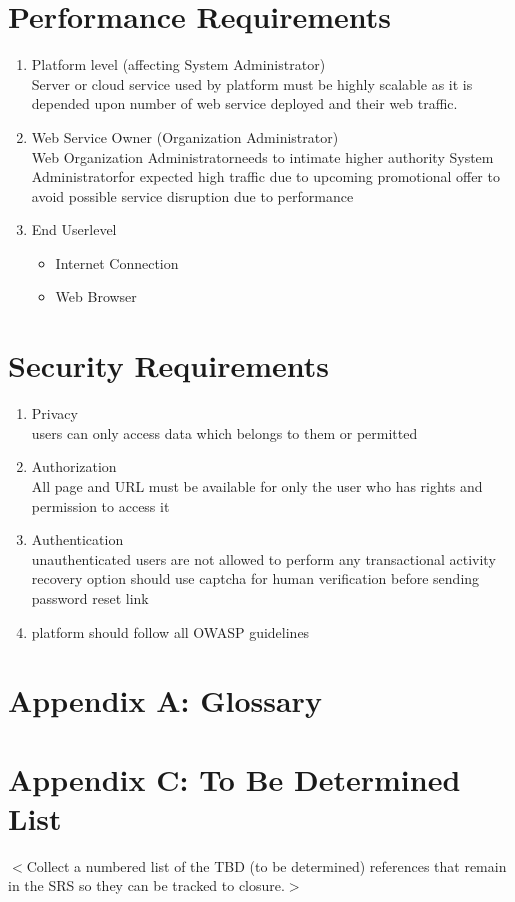 \documentclass{report}
\newcommand*\arrow{\item[$\Rightarrow$]}
\def\superuser{System Administrator}
\def\admin{Organization Administrator}
\def\user{End User}
\begin{document}
\section{Performance Requirements}
\begin{enumerate}[start=1,label={\bfseries REQ \arabic*:}]
	\addtolength{\itemindent}{40pt}
	\item Platform level (affecting \superuser)
		\\ Server or cloud service used by platform must be highly scalable as it is depended upon number of web service deployed and their web traffic.
	\item Web Service Owner (\admin)
		\\ Web \admin \space needs to intimate higher authority \superuser \space for expected high traffic due to upcoming promotional offer to avoid possible service disruption due to performance
	\item \user \space level
		\begin{itemize}
			\arrow Internet Connection
			\arrow Web Browser
		\end{itemize}
\end{enumerate}

\section{Security Requirements}

\begin{enumerate}[start=1,label={\bfseries REQ \arabic*:}]
	\addtolength{\itemindent}{40pt}
	\item Privacy
		\\ users can only access data which belongs to them or permitted
	\item Authorization
		\\ All page and URL must be available for only the user who has rights and permission to access it
	\item Authentication
		\\ unauthenticated users are not allowed to perform any transactional activity
		\\ recovery option should use captcha for human verification before sending password reset link
	\item platform should follow all OWASP guidelines
		
\end{enumerate}

\section{Appendix A: Glossary}
\printglossary[type=\acronymtype]

\section{Appendix C: To Be Determined List}
$<$Collect a numbered list of the TBD (to be determined) references that remain 
in the SRS so they can be tracked to closure.$>$
\end{document}
